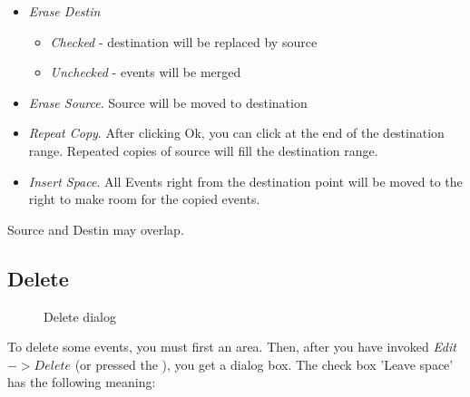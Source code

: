 \documentclass[letterpaper]{report}
\begin{document}
\begin{itemize}
\item {\em Erase Destin}

\begin{itemize}
\item {\em Checked} - destination will be replaced by source
\item {\em Unchecked} - events will be merged
\end{itemize}

\item {\em Erase Source}. Source will be moved to destination

\item {\em Repeat Copy}. After clicking Ok, you can click at the end of the
destination range. Repeated copies of source will fill the destination range.

\item {\em Insert Space}. All Events right from the destination point will
be moved to the right to make room for the copied events.

\end{itemize}

Source and Destin may overlap.



\subsection{Delete}\label{delete}

\begin{figure}
\caption{Delete dialog}
\end{figure}

To delete some events, you must first  an area.
Then, after you have invoked {\em Edit$->Delete$} (or pressed the
), you get a
dialog box. The check box 'Leave space' has the following meaning:
\end{document}
